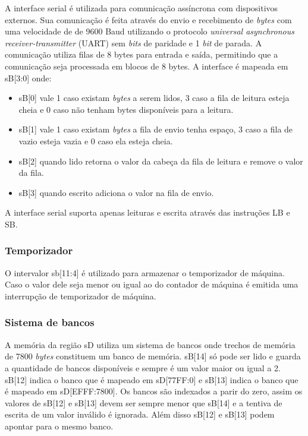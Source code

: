 A interface serial é utilizada para comunicação assíncrona com dispositivos externos. Sua comunicação é feita através do envio e recebimento de \emph{bytes}
com uma velocidade de  de 9600 Baud utilizando o protocolo \emph{universal asynchronous receiver-transmitter} (UART) sem \emph{bits} de paridade e 1 
\emph{bit} de parada. A comunicação utiliza filas de 8 bytes para entrada e saída, permitindo que a comunicação seja processada em blocos de 8 bytes.
A interface é mapeada em sB[3:0] onde:
\begin{itemize}
  \item sB[0] vale 1 caso existam \emph{bytes} a serem lidos, 3 caso a fila de leitura esteja cheia e 0 caso não tenham bytes disponíveis para a leitura.
  \item sB[1] vale 1 caso existam \emph{bytes} a fila de envio tenha espaço, 3 caso a fila de vazio esteja vazia e 0 caso ela esteja cheia.
  \item sB[2] quando lido retorna o valor da cabeça da fila de leitura e remove o valor da fila.
  \item sB[3] quando escrito adiciona o valor na fila de envio.
\end{itemize}

A interface serial suporta apenas leituras e escrita através das instruções LB e SB.

\subsubsection{Temporizador}
\label{ssec:timerm}

O intervalor sb[11:4] é utilizado para armazenar o temporizador de máquina. Caso o valor dele seja menor ou igual ao do contador de máquina
é emitida uma interrupção de temporizador de máquina.

\subsubsection{Sistema de bancos}
\label{ssec:bancos}

A memória da região sD utiliza um sistema de bancos onde trechos de memória de 7800 \emph{bytes} constituem um banco de memória. sB[14] só pode ser lido 
e guarda a quantidade de bancos disponíveis e sempre é um valor maior ou igual a 2. 
sB[12] indica o banco que é mapeado em sD[77FF:0] e sB[13] indica o banco que é
mapeado em sD[EFFF:7800]. Os bancos são indexados a parir do zero, assim os valores de sB[12] e sB[13] devem ser sempre menor que sB[14] e a tentiva de
escrita de um valor inválido é ignorada. Além disso sB[12] e sB[13] podem apontar para o mesmo banco.

